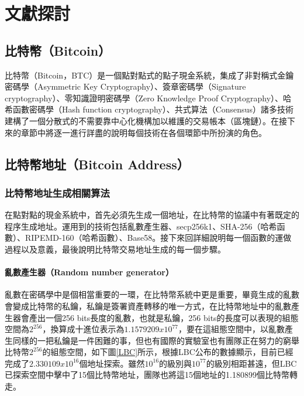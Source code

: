 
\chapter{文獻探討}
	\section{比特幣（Bitcoin）}
	比特幣（Bitcoin，BTC）是一個點對點式的點子現金系統，集成了非對稱式金鑰密碼學（Asymmetric Key Cryptography）\parencite{AsymmetricKeyCryptography}、簽章密碼學（Signature cryptography）、零知識證明密碼學（Zero Knowledge Proof Cryptography）\parencite{Zero-KnowledgeProofsofIdentity}、哈希函數密碼學（Hash function cryptography）、共式算法（Consensus）諸多技術建構了一個分散式的不需要靠中心化機構加以維護的交易帳本（區塊鏈）。在接下來的章節中將逐一進行詳盡的說明每個技術在各個環節中所扮演的角色。

	\section{比特幣地址（Bitcoin Address）}

		\subsection{比特幣地址生成相關算法}
		在點對點的現金系統中，首先必須先生成一個地址，在比特幣的協議中有著既定的程序生成地址。運用到的技術包括亂數產生器、secp256k1\parencite{johnson2001elliptic}、SHA-256（哈希函數）\parencite{DBLP:conf/fse/KhovratovichRS12}、RIPEMD-160（哈希函數）\parencite{DBLP:conf/isw/MendelPRR06}、Base58\parencite{Base58}。接下來回詳細說明每一個函數的運做過程以及意義，最後說明比特幣交易地址生成的每一個步驟。
		
			\subsubsection{亂數產生器（Random number generator）}
			亂數在密碼學中是個相當重要的一環，在比特幣系統中更是重要，畢竟生成的亂數會變成比特幣的私鑰，私鑰是簽署資產轉移的唯一方式，在比特幣地址中的亂數產生器會產出一個256 bits長度的亂數，也就是私鑰，256 bits的長度可以表現的組態空間為$2^{256}$，換算成十進位表示為$1.1579209x10^{77}$，要在這組態空間中，以亂數產生同樣的一把私鑰是一件困難的事，但也有國際的實驗室\parencite{TheLargeBitcoinCollider}也有團隊正在努力的窮舉比特幣$2^{256}$的組態空間，如下圖\ref{LBC}所示，根據LBC公布的數據顯示，目前已經完成了$2.330109x10^{16}$個地址探索。雖然$10^{16}$的級別與$10^{77}$的級別相距甚遠，但LBC已探索空間中擊中了15個比特幣地址，團隊也將這15個地址的1.180899個比特幣轉走。

